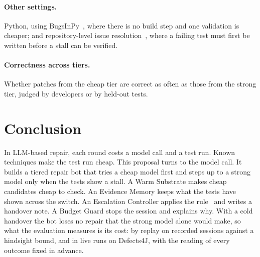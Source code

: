 \paragraph{Other settings.} Python, using
BugsInPy~\citep{widyasari2020bugsinpy}, where there is no build step and one
validation is cheaper; and repository-level issue
resolution~\citep{jimenez2024swebench}, where a failing test must first be
written before a stall can be verified.

\paragraph{Correctness across tiers.} Whether patches from the cheap tier are
correct as often as those from the strong tier, judged by developers or by
held-out tests.

\section{Conclusion}
\label{sec:plan-conclusion}

In LLM-based repair, each round costs a model call and a test run. Known
techniques make the test run cheap. This proposal turns to the model call. It
builds a tiered repair bot that tries a cheap model first and steps up to a
strong model only when the tests show a stall. A Warm Substrate makes cheap
candidates cheap to check. An Evidence Memory keeps what the tests have shown
across the switch. An Escalation Controller applies the rule \Step\ and writes
a handover note. A Budget Guard stops the session and explains why. With a
cold handover the bot loses no repair that the strong model alone would make,
so what the evaluation measures is its cost: by replay on recorded sessions
against a hindsight bound, and in live runs on Defects4J, with the reading of
every outcome fixed in advance.
